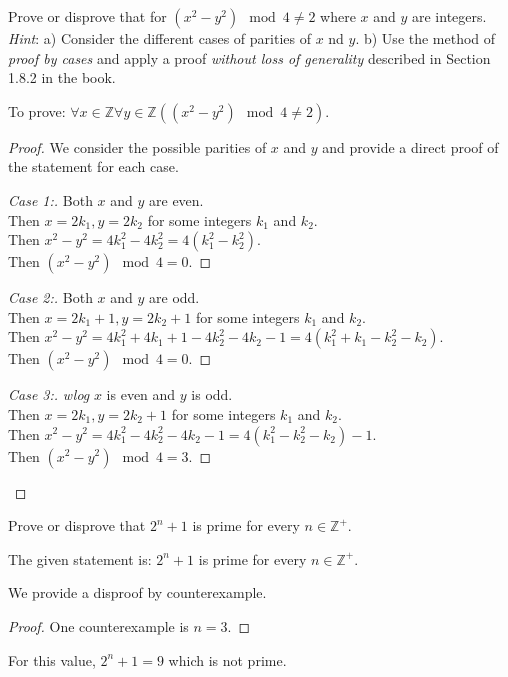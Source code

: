 \documentclass[a4paper]{exam}
\theoremstyle{definition}
\newcommand\Z{\ensuremath{\mathbb{Z}}}
\begin{document}
\begin{questions}
\question Prove or disprove that for $(x^2 - y^2) \mod 4 \neq 2$ where $x$ and $y$ are integers.\\
  \textit{Hint}: a) Consider the different cases of parities of $x$ nd $y$. b) Use the method of \textit{proof by cases} and apply a proof \textit{without loss of generality} described in Section 1.8.2 in the book.

  \begin{solution}
    To prove: $\forall x\in\Z\forall y\in\Z((x^2 - y^2) \mod 4 \neq 2)$.

    \begin{proof} We consider the possible parities of $x$ and $y$ and provide a direct proof of the statement for each case.
    \begin{proof}[Case 1:] Both $x$ and $y$ are even.\\
      Then $x=2k_1, y=2k_2$ for some integers $k_1$ and $k_2$.\\
      Then $x^2-y^2=4k_1^2-4k_2^2=4(k_1^2-k_2^2)$.\\
      Then $(x^2 - y^2) \mod 4 = 0$.
    \end{proof}
    
    \begin{proof}[Case 2:] Both $x$ and $y$ are odd.\\
      Then $x=2k_1+1, y=2k_2+1$ for some integers $k_1$ and $k_2$.\\
      Then $x^2-y^2=4k_1^2+4k_1+1-4k_2^2-4k_2-1=4(k_1^2+k_1-k_2^2-k_2)$.\\
      Then $(x^2 - y^2) \mod 4 = 0$.
    \end{proof}      
    \begin{proof}[Case 3:] \textit{wlog} $x$ is even and $y$ is odd.\\
      Then $x=2k_1, y=2k_2+1$ for some integers $k_1$ and $k_2$.\\
      Then $x^2-y^2=4k_1^2-4k_2^2-4k_2-1=4(k_1^2-k_2^2-k_2)-1$.\\
      Then $(x^2 - y^2) \mod 4 = 3$.
    \end{proof}
    
    \end{proof}
  \end{solution}

\question 
  Prove or disprove that $2^n + 1$ is prime for every $n\in\Z^+$.

  \begin{solution}
    The given statement is: $2^n + 1$ is prime for every $n\in\Z^+$.

    We provide a disproof by counterexample.

    \begin{proof}
      One counterexample is $n=3$.
    \end{proof}
        
    For this value, $2^n+1=9$ which is not prime.
  \end{solution}
\end{questions}
\end{document}
